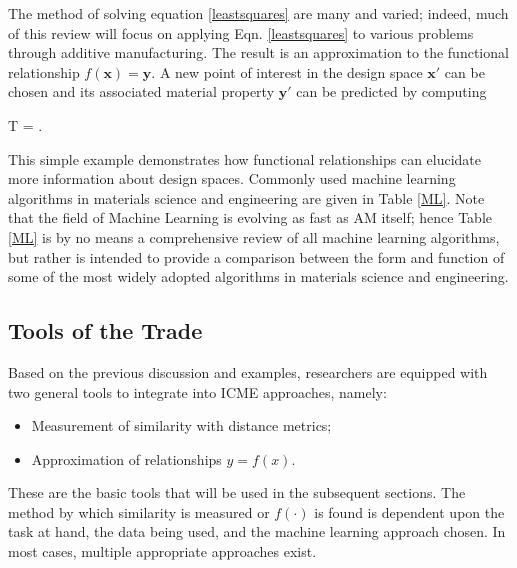 
The method of solving equation \ref{leastsquares} are many and varied; indeed, much of this review will focus on applying Eqn. \ref{leastsquares} to various problems through additive manufacturing.
The result is an approximation to the functional relationship $f(\mathbf{x}) = \mathbf{y}$.
A new point of interest in the design space $\mathbf{x'}$ can be chosen and its associated material property $\mathbf{y'}$ can be predicted by computing

\eqn
{}T = .
\equ

This simple example demonstrates how functional relationships can elucidate more information about design spaces.
Commonly used machine learning algorithms in materials science and engineering are given in Table \ref{ML}.
Note that the field of Machine Learning is evolving as fast as AM itself; hence Table \ref{ML} is by no means a comprehensive review of all machine learning algorithms, but rather is intended to provide a comparison between the form and function of some of the most widely adopted algorithms in materials science and engineering.



\subsection{Tools of the Trade}
Based on the previous discussion and examples, researchers are equipped with two general tools to integrate into ICME approaches, namely:

\begin{itemize}
	\item Measurement of similarity with distance metrics;
	\item Approximation of relationships $y=f(x)$.
\end{itemize}

These are the basic tools that will be used in the subsequent sections.
The method by which similarity is measured or $f(\cdot)$ is found is dependent upon the task at hand, the data being used, and the machine learning approach chosen.
In most cases, multiple appropriate approaches exist.

